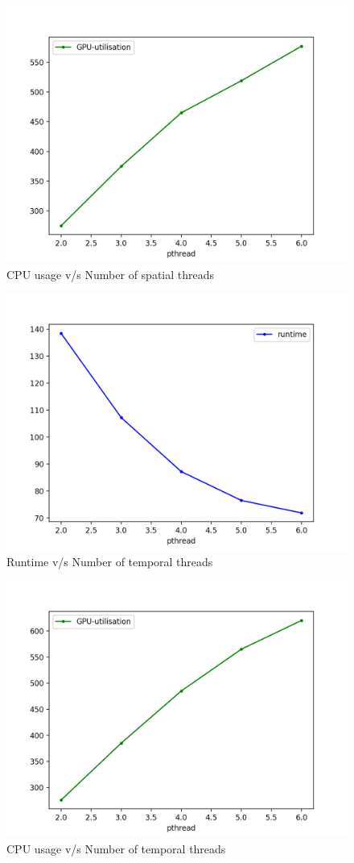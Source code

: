 \documentclass[a4paper]{article}
\begin{document}
\begin{figure}[H]
    \centering
    \includegraphics[width=0.5\linewidth]{GPU-spatial-threads-dynamic.png}
    \caption{CPU usage v/s Number of spatial threads}
    \label{fig:pthread-spatial-dynamic.png}
\end{figure}
\begin{figure}[H]
    \centering
    \includegraphics[width=0.5\linewidth]{runtime-temporal-pthread-dynamic.png}
    \caption{Runtime v/s Number of temporal threads}
    \label{fig:pthread-spatial-dynamic.png}
\end{figure}
\begin{figure}[H]
    \centering
    \includegraphics[width=0.5\linewidth]{GPU-utilisation-temporal-pthread-dynamic.png}
    \caption{CPU usage  v/s Number of temporal threads}
    \label{fig:pthread-spatial-dynamic.png}
\end{figure}
\end{document}
